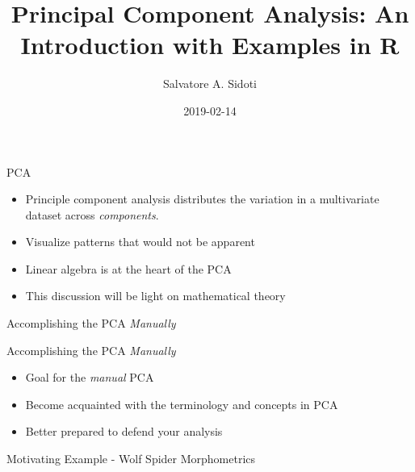 \documentclass[ignorenonframetext,]{beamer}
\title{Principal Component Analysis: An Introduction with Examples in R}
\author{Salvatore A. Sidoti}
\date{2019-02-14}
\providecommand{\tightlist}{%
  \setlength{\itemsep}{0pt}\setlength{\parskip}{0pt}}
\begin{document}
\frame{\titlepage}

\begin{frame}

\begin{block}{PCA}

\begin{itemize}
\tightlist
\item
  Principle component analysis distributes the variation in a
  multivariate dataset across \emph{components}.
\item
  Visualize patterns that would not be apparent
\item
  Linear algebra is at the heart of the PCA
\item
  This discussion will be light on mathematical theory
\end{itemize}

\end{block}

\end{frame}

\begin{frame}{Accomplishing the PCA \emph{Manually}}
\protect\hypertarget{accomplishing-the-pca-manually}{}

\begin{block}{Accomplishing the PCA \emph{Manually}}

\begin{itemize}
\tightlist
\item
  Goal for the \emph{manual} PCA
\item
  Become acquainted with the terminology and concepts in PCA
\item
  Better prepared to defend your analysis
\end{itemize}

\end{block}

\end{frame}

\begin{frame}{Motivating Example - Wolf Spider Morphometrics}
\protect\hypertarget{motivating-example---wolf-spider-morphometrics}{}

\end{frame}
\end{document}
